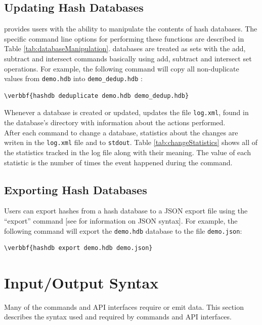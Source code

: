 \documentclass[11pt,fleqn]{article} %
\begin{document}
\subsection{Updating Hash Databases}
\label{updateSection}
\hdb provides users with the ability to manipulate the contents of hash databases. The specific command line options for performing these functions are described in Table \ref{tab:databaseManipulation}. \hdb databases are treated as sets with the add, subtract and intersect commands basically using add, subtract and intersect set operations. For example, the following command will  copy all non-duplicate values from \texttt{demo.hdb} into \texttt{demo\_dedup.hdb} :
\begin{Verbatim}[commandchars=\\\{\}]
\verbbf{hashdb deduplicate demo.hdb demo_dedup.hdb}
\end{Verbatim}
Whenever a database is created or updated, \hdb updates the file \texttt{log.xml}, found in the database's directory with information about the actions performed.\\

After each command to change a database, statistics about the changes are writen in the \texttt{log.xml} file and to \texttt{stdout}. Table \ref{tab:changeStatistics} shows all of the statistics tracked in the log file along with their meaning. The value of each statistic is the number of times the event happened during the command.\\


\subsection{Exporting Hash Databases}
Users can export hashes from a hash database to a JSON export file using the ``export'' command [see \textbf{} for information on JSON syntax].  For example, the following command will export the \texttt{demo.hdb} database to the file \texttt{demo.json}:
\begin{Verbatim}[commandchars=\\\{\}]
\verbbf{hashdb export demo.hdb demo.json}
\end{Verbatim}

\section{\hdb Input/Output Syntax}
\label{InputOutputSyntax}
Many of the \hdb commands and API interfaces require or emit data.
This section describes the syntax used and required by \hdb
commands and API interfaces.
\end{document}

